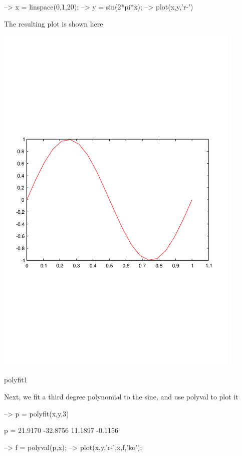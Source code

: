 \begin{DoxyVerbInclude}
--> x = linspace(0,1,20);
--> y = sin(2*pi*x);
--> plot(x,y,'r-')
\end{DoxyVerbInclude}


The resulting plot is shown here  
\begin{DoxyImage}
\includegraphics[width=12cm]{polyfit1}
\caption{polyfit1}
\end{DoxyImage}
 Next, we fit a third degree polynomial to the sine, and use {\ttfamily polyval} to plot it


\begin{DoxyVerbInclude}
--> p = polyfit(x,y,3)

p = 
   21.9170  -32.8756   11.1897   -0.1156 

--> f = polyval(p,x);
--> plot(x,y,'r-',x,f,'ko');
\end{DoxyVerbInclude}


